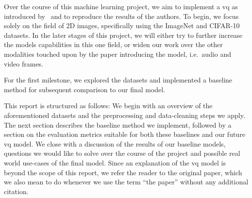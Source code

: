 Over the course of this machine learning project, we aim to implement a \ac{vq} as introduced by~\cite{vqvae}
and to reproduce the results of the authors.
To begin, we focus solely on the field of 2D images, specifically using the ImageNet and CIFAR-10 datasets.
In the later stages of this project, we will either try to further increase the models capabilities in this one field,
or widen our work over the other modalities touched upon by the paper introducing the model, i.e.\ audio and video
frames.

For the first milestone, we explored the datasets and implemented a baseline method for subsequent comparison to our
final model.

This report is structured as follows: We begin with an overview of the aforementioned datasets and the preprocessing and
data-cleaning steps we apply.
The next section describes the baseline method we implement, followed by a section on the evaluation metrics suitable
for both these baselines and our future \ac{vq} model.
We close with a discussion of the results of our baseline models, questions we would like to solve over the course of
the project and possible real world use-cases of the final model.
Since an explanation of the \ac{vq} model is beyond the scope of this report, we refer the reader to the original paper,
which we also mean to do whenever we use the term ``the paper'' without any additional citation.